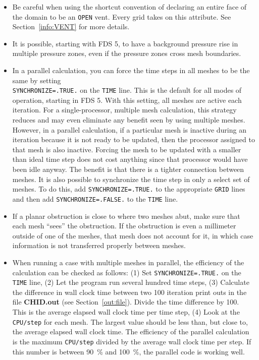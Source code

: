 \documentclass[11pt]{book}
\newcommand{\ct}{\tt\small}
\begin{document}
\begin{itemize}
\item Be careful when using the shortcut convention of declaring an
entire face of the domain to be an {\ct OPEN} vent. Every grid
takes on this attribute. See Section~\ref{info:VENT} for more details.
\item It is possible, starting with FDS 5, to have a background pressure rise in multiple pressure zones,
even if the pressure zones
cross mesh boundaries.
\item In a parallel calculation, you can force the time steps in all meshes to
be the same by setting \\
{\ct SYNCHRONIZE=.TRUE.} on the {\ct TIME} line.
This is the default for all modes of operation, starting in FDS 5. With this
setting, all meshes are active each iteration. For a single-processor, multiple mesh
calculation, this strategy reduces
and may even eliminate any benefit seen by using multiple meshes. However, in a
parallel calculation, if a particular mesh is inactive during an iteration because
it is not ready to be updated, then the processor assigned to that mesh is also
inactive. Forcing the mesh to be updated with a smaller than ideal time step does not
cost anything since that processor would have been idle anyway. The benefit is that
there is a tighter connection between meshes.
It is also possible to synchronize the time step in only a select set of meshes. To do
this, add {\ct SYNCHRONIZE=.TRUE.} to the appropriate {\ct GRID} lines and then add
{\ct SYNCHRONIZE=.FALSE.} to the {\ct TIME} line.
\item If a planar obstruction is close to where two meshes abut, make sure that each
mesh ``sees'' the obstruction. If the obstruction is even a millimeter outside of one
of the meshes, that mesh does not account for it, in which case information is not
transferred properly between meshes.
\item When running a case with multiple meshes in parallel, the efficiency of the
calculation can be checked as follows: (1) Set {\ct SYNCHRONIZE=.TRUE.} on the
{\ct TIME} line, (2) Let the program run several hundred time steps, (3) Calculate
the difference in wall clock time between two 100 iteration print outs in
the file {\bf CHID.out} (see Section~\ref{out:file}).
Divide the time difference by 100. This is the average
elapsed wall clock time per time step, (4) Look at the {\ct CPU/step} for each mesh. The
largest value should be less than, but close to, the average elapsed wall clock time.
The efficiency of the parallel calculation is the maximum {\ct CPU/step} divided by
the average wall clock time per step. If this number is between 90~\% and 100~\%, the
parallel code is working well.
\end{itemize}
\end{document}
